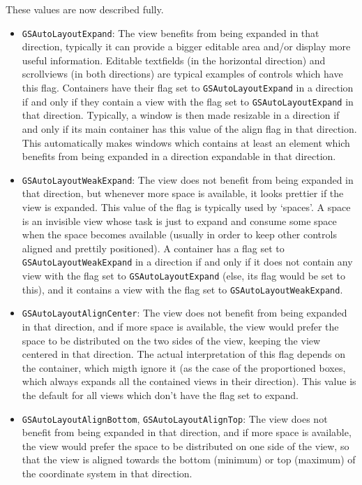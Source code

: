 These values are now described fully.
\begin{itemize}

\item \texttt{GSAutoLayoutExpand}: The view benefits from being expanded
in that direction, typically it can provide a bigger editable area
and/or display more useful information.  Editable textfields (in the
horizontal direction) and scrollviews (in both directions) are typical
examples of controls which have this flag.  Containers have their flag
set to \texttt{GSAutoLayoutExpand} in a direction if and only if they
contain a view with the flag set to \texttt{GSAutoLayoutExpand} in
that direction.  Typically, a window is then made resizable in a
direction if and only if its main container has this value of the
align flag in that direction.  This automatically makes windows which
contains at least an element which benefits from being expanded in a
direction expandable in that direction.

\item \texttt{GSAutoLayoutWeakExpand}:  The view does not benefit from being
expanded in that direction, but whenever more space is available, it
looks prettier if the view is expanded.  This value of the flag is
typically used by `spaces'.  A space is an invisible view whose task
is just to expand and consume some space when the space becomes
available (usually in order to keep other controls aligned and
prettily positioned).  A container has a flag set to
\texttt{GSAutoLayoutWeakExpand} in a direction if and only if it does 
not contain any view with the flag set to \texttt{GSAutoLayoutExpand}
(else, its flag would be set to this), and it contains a view with the
flag set to \texttt{GSAutoLayoutWeakExpand}.

\item \texttt{GSAutoLayoutAlignCenter}: The view does not benefit from being
expanded in that direction, and if more space is available, the view
would prefer the space to be distributed on the two sides of the view,
keeping the view centered in that direction.  The actual
interpretation of this flag depends on the container, which migth
ignore it (as the case of the proportioned boxes, which always expands
all the contained views in their direction).  This value is the
default for all views which don't have the flag set to expand.

\item \texttt{GSAutoLayoutAlignBottom}, \texttt{GSAutoLayoutAlignTop}:
The view does not benefit from being expanded in that direction, and
if more space is available, the view would prefer the space to be
distributed on one side of the view, so that the view is aligned
towards the bottom (minimum) or top (maximum) of the coordinate system
in that direction.

\end{itemize}

